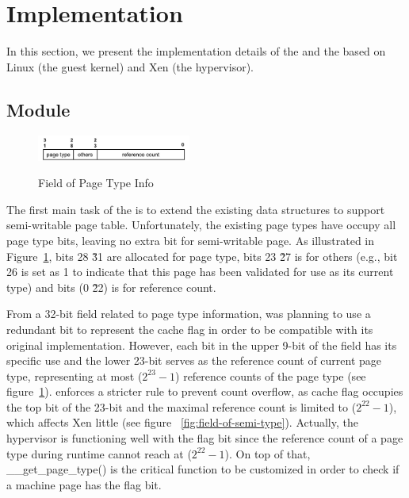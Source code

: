 \section{Implementation} \label{sec:impl}
In this section, we present the implementation details of the \module and the \cache based on Linux (the guest kernel) and Xen (the hypervisor).

\subsection{\name Module}
\begin{figure}[ht]
\centering
\includegraphics[width=0.45\textwidth]{image/implementation/field-of-page-type-info.jpg} \\
\caption{Field of Page Type Info}
\label{fig:field-of-page-type-info}
\end{figure}
The first main task of the \module is to extend the existing data structures to support semi-writable page table.
Unfortunately, the existing page types have occupy all page type bits, leaving no extra bit for semi-writable page.
As illustrated in Figure~\ref{fig:field-of-page-type-info}, bits 28 \~31 are allocated for page type, bits 23 \~ 27 is for others (e.g., bit 26 is set as 1 to indicate that this page has been validated for use as its current type) and bits (0 \~ 22) is for reference count.

From a 32-bit field related to page type information, \name was planning to use a redundant bit to represent the cache flag in order to be compatible with its original implementation. However, each bit in the upper 9-bit of the field has its specific use and the lower 23-bit serves as the reference count of current page type, representing at most ($2^{23}-1$) reference counts of the page type (see figure~\ref{fig:field-of-page-type-info}). \name enforces a stricter rule to prevent count overflow, as cache flag occupies the top bit of the 23-bit and the maximal reference count is limited to ($2^{22}-1$), which affects Xen little (see figure ~\ref{fig:field-of-semi-type}). Actually, the hypervisor is functioning well with the flag bit since the reference count of a page type during runtime cannot reach at ($2^{22}-1$). On top of that, \_\_get\_page\_type() is the critical function to be customized in order to check if a machine page has the flag bit.

